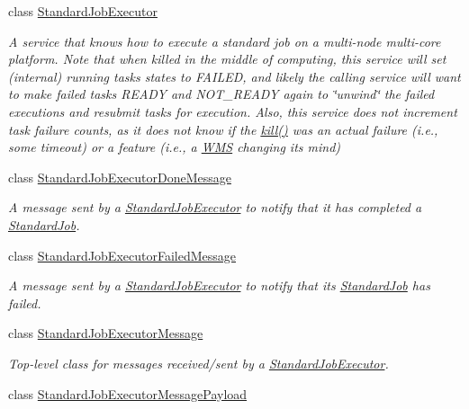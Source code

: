 \begin{DoxyCompactItemize}
class \hyperlink{classwrench_1_1_standard_job_executor}{Standard\+Job\+Executor}
\begin{DoxyCompactList}\small\item\em A service that knows how to execute a standard job on a multi-\/node multi-\/core platform. Note that when killed in the middle of computing, this service will set (internal) running tasks\textquotesingle{} states to F\+A\+I\+L\+ED, and likely the calling service will want to make failed tasks R\+E\+A\+DY and N\+O\+T\+\_\+\+R\+E\+A\+DY again to \char`\"{}unwind\char`\"{} the failed executions and resubmit tasks for execution. Also, this service does not increment task failure counts, as it does not know if the \hyperlink{classwrench_1_1_standard_job_executor_aec6a1864dacefd357399bc058e3ae08f}{kill()} was an actual failure (i.\+e., some timeout) or a feature (i.\+e., a \hyperlink{classwrench_1_1_w_m_s}{W\+MS} changing its mind) \end{DoxyCompactList}\item 
class \hyperlink{classwrench_1_1_standard_job_executor_done_message}{Standard\+Job\+Executor\+Done\+Message}
\begin{DoxyCompactList}\small\item\em A message sent by a \hyperlink{classwrench_1_1_standard_job_executor}{Standard\+Job\+Executor} to notify that it has completed a \hyperlink{classwrench_1_1_standard_job}{Standard\+Job}. \end{DoxyCompactList}\item 
class \hyperlink{classwrench_1_1_standard_job_executor_failed_message}{Standard\+Job\+Executor\+Failed\+Message}
\begin{DoxyCompactList}\small\item\em A message sent by a \hyperlink{classwrench_1_1_standard_job_executor}{Standard\+Job\+Executor} to notify that its \hyperlink{classwrench_1_1_standard_job}{Standard\+Job} has failed. \end{DoxyCompactList}\item 
class \hyperlink{classwrench_1_1_standard_job_executor_message}{Standard\+Job\+Executor\+Message}
\begin{DoxyCompactList}\small\item\em Top-\/level class for messages received/sent by a \hyperlink{classwrench_1_1_standard_job_executor}{Standard\+Job\+Executor}. \end{DoxyCompactList}\item 
class \hyperlink{classwrench_1_1_standard_job_executor_message_payload}{Standard\+Job\+Executor\+Message\+Payload}

\end{DoxyCompactItemize}
